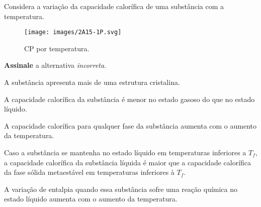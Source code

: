 \documentclass[braun, twocolumn]{braun}
\begin{document}
\begin{problem}
[2A15]Considera a variação da capacidade calorífica de uma substância com a
temperatura.

\begin{figure}
\centering
\texttt{[image: images/2A15-1P.svg]}
\caption{CP por temperatura.}
\end{figure}

\textbf{Assinale} a alternativa \emph{incorreta}.


\begin{choices}

\item A substância apresenta mais de uma estrutura cristalina.

\item A capacidade calorífica da substância é menor no estado gasoso do que no
estado líquido.

\item A capacidade calorífica para qualquer fase da substância aumenta com o
aumento da temperatura.

\item Caso a substância se mantenha no estado líquido em temperaturas
inferiores a \(T_f\), a capacidade calorífica da substância líquida é
maior que a capacidade calorífica da fase sólida metaestável em
temperaturas inferiores à \(T_f\).

\item A variação de entalpia quando essa substância sofre uma reação química
no estado líquido aumenta com o aumento da temperatura.

\end{choices}

\end{problem}
\end{document}
